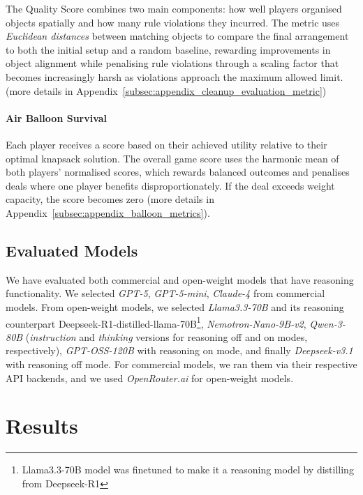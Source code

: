 \documentclass[11pt]{article}
\begin{document}
The Quality Score combines two main components: how well players organised objects spatially and how many rule violations they incurred. The metric uses \textit{Euclidean distances} between matching objects to compare the final arrangement to both the initial setup and a random baseline, rewarding improvements in object alignment while penalising rule violations through a scaling factor that becomes increasingly harsh as violations approach the maximum allowed limit.
(more details in Appendix~\ref{subsec:appendix_cleanup_evaluation_metric})



\paragraph{Air Balloon Survival}

Each player receives a score based on their achieved utility relative to their optimal knapsack solution. The overall game score uses the harmonic mean of both players' normalised scores, which rewards balanced outcomes and penalises deals where one player benefits disproportionately. If the deal exceeds weight capacity, the score becomes zero (more details in Appendix~\ref{subsec:appendix_balloon_metrics}).

\subsection{Evaluated Models}

We have evaluated both commercial and open-weight models that have reasoning functionality. We selected \textit{GPT-5}, \textit{GPT-5-mini}, \textit{Claude-4} from commercial models. From open-weight models, we selected \textit{Llama3.3-70B} and its reasoning counterpart Deepseek-R1-distilled-llama-70B\footnote{Llama3.3-70B model was finetuned to make it a reasoning model by distilling from Deepseek-R1}, \textit{Nemotron-Nano-9B-v2}, \textit{Qwen-3-80B} (\textit{instruction} and \textit{thinking} versions for reasoning off and on modes, respectively), \textit{GPT-OSS-120B} with reasoning on mode, and finally \textit{Deepseek-v3.1} with reasoning off mode. For commercial models, we ran them via their respective API backends, and we used \textit{OpenRouter.ai} for open-weight models.


\section{Results}
\end{document}
